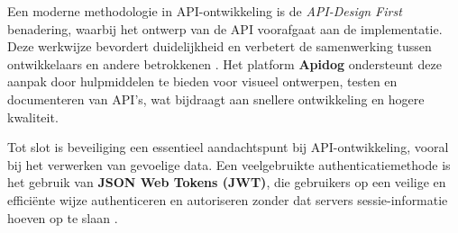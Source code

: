 Een moderne methodologie in API-ontwikkeling is de \textit{API-Design First} benadering, waarbij het ontwerp van de API voorafgaat aan de implementatie. Deze werkwijze bevordert duidelijkheid en verbetert de samenwerking tussen ontwikkelaars en andere betrokkenen \autocite{apidog}. Het platform \textbf{Apidog} ondersteunt deze aanpak door hulpmiddelen te bieden voor visueel ontwerpen, testen en documenteren van API's, wat bijdraagt aan snellere ontwikkeling en hogere kwaliteit.

Tot slot is beveiliging een essentieel aandachtspunt bij API-ontwikkeling, vooral bij het verwerken van gevoelige data. Een veelgebruikte authenticatiemethode is het gebruik van \textbf{JSON Web Tokens (JWT)}, die gebruikers op een veilige en efficiënte wijze authenticeren en autoriseren zonder dat servers sessie-informatie hoeven op te slaan \autocite{Gordadze}.




